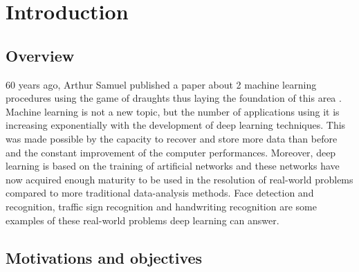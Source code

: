 
\chapter{Introduction} %

\label{Chapter1} %



\section{Overview}

60 years ago, Arthur Samuel published a paper about 2 machine learning procedures using the game of draughts thus laying the foundation of this area  \cite{Samuel}. Machine learning is not a new topic,  but the number of applications using it is increasing exponentially with the development of deep learning techniques. This was made possible by the capacity to recover and store more data than before and the constant improvement of the computer performances. Moreover, deep learning is based on the training of artificial networks and these networks have now acquired enough maturity to be used in the resolution of real-world problems compared to more traditional data-analysis methods. 
Face detection and recognition, traffic sign recognition and handwriting recognition are some examples of these real-world problems deep learning can answer. 





\section{Motivations and objectives}


